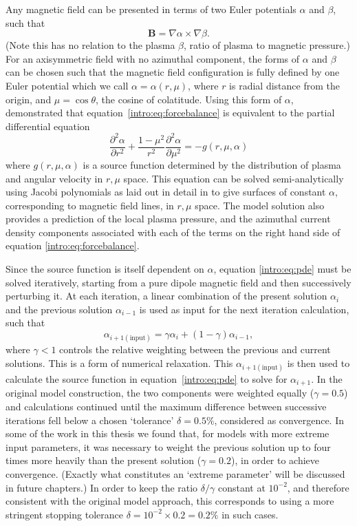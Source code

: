 Any magnetic field can be presented in terms of two Euler potentials $\alpha$ and $\beta$, such that 
\begin{equation}
\boldsymbol{B} = \nabla \alpha \times \nabla \beta.
\end{equation}
(Note this has no relation to the plasma $\beta$, ratio of plasma to magnetic pressure.) For an axisymmetric field with no azimuthal component, the forms of $\alpha$ and $\beta$ can be chosen such that the magnetic field configuration is fully defined by one Euler potential which we call $\alpha = \alpha(r,\mu)$, where $r$ is radial distance from the origin, and $\mu = \cos\theta$, the cosine of colatitude. Using this form of $\alpha$, \citet{caudal1986} demonstrated that equation~\ref{intro:eq:forcebalance} is equivalent to the partial differential equation
\begin{equation}\label{intro:eq:pde}
\frac{\partial^2\alpha}{\partial r^2} + \frac{1-\mu^2}{r^2} \frac{\partial^2\alpha}{\partial \mu^2} = -g(r,\mu,\alpha)
\end{equation}
where $g(r,\mu,\alpha)$ is a source function determined by the distribution of plasma and angular velocity in $r,\mu$ space. This equation can be solved semi-analytically using Jacobi polynomials as laid out in detail in \citet[Appendix]{achilleos2010a} to give surfaces of constant $\alpha$, corresponding to magnetic field lines, in $r, \mu$ space. The model solution also provides a prediction of the local plasma pressure, and the azimuthal current density components associated with each of the terms on the right hand side of equation \ref{intro:eq:forcebalance}. 

Since the source function is itself dependent on $\alpha$, equation \ref{intro:eq:pde} must be solved iteratively, starting from a pure dipole magnetic field and then successively perturbing it. At each iteration, a linear combination of the present solution $\alpha_i$ and the previous solution $\alpha_{i-1}$ is used as input for the next iteration calculation, such that
\begin{equation}
\alpha_{i+1\mathrm{(input)}} = \gamma\alpha_i + (1-\gamma)\alpha_{i-1},
\end{equation}
where $\gamma<1$ controls the relative weighting between the previous and current solutions. This is a form of numerical relaxation. This $\alpha_{i+1(\mathrm{input})}$ is then used to calculate the source function in equation~\ref{intro:eq:pde} to solve for $\alpha_{i+1}$. In the original model construction, the two components were weighted equally ($\gamma=0.5$) and calculations continued until the maximum difference between successive iterations fell below a chosen `tolerance' $\delta = 0.5\%$, considered as convergence. In some of the work in this thesis we found that, for models with more extreme input parameters, it was necessary to weight the previous solution up to four times more heavily than the present solution ($\gamma=0.2$), in order to achieve convergence. (Exactly what constitutes an `extreme parameter' will be discussed in future chapters.) In order to keep the ratio $\delta/\gamma$ constant at $10^{-2}$, and therefore consistent with the original model approach, this corresponds to using a more stringent stopping tolerance $\delta = 10^{-2}\times0.2 = 0.2\%$ in such cases.


